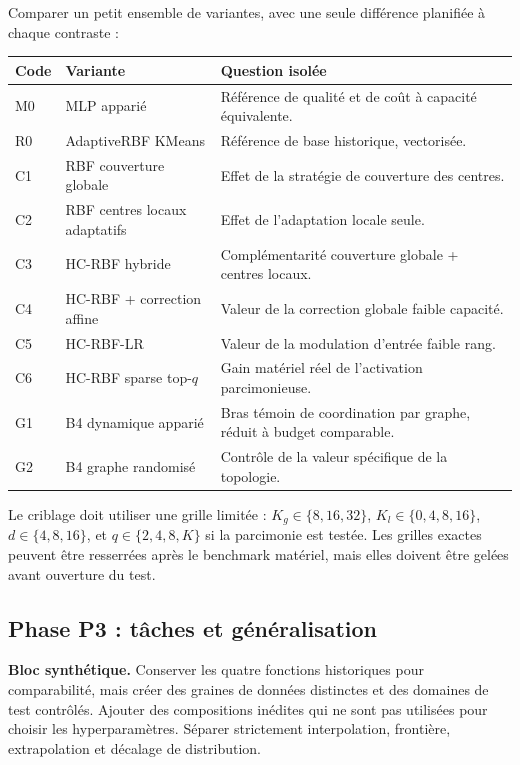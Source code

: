 \documentclass[11pt,a4paper]{article}
\begin{document}
Comparer un petit ensemble de variantes, avec une seule différence planifiée à chaque contraste :
\begin{center}
\small
\begin{tabular}{P{2.0cm}P{4.0cm}P{7.2cm}}
\toprule
\textbf{Code} & \textbf{Variante} & \textbf{Question isolée}\\
\midrule
M0 & MLP apparié & Référence de qualité et de coût à capacité équivalente.\\
R0 & AdaptiveRBF KMeans & Référence de base historique, vectorisée.\\
C1 & RBF couverture globale & Effet de la stratégie de couverture des centres.\\
C2 & RBF centres locaux adaptatifs & Effet de l'adaptation locale seule.\\
C3 & HC-RBF hybride & Complémentarité couverture globale + centres locaux.\\
C4 & HC-RBF + correction affine & Valeur de la correction globale faible capacité.\\
C5 & HC-RBF-LR & Valeur de la modulation d'entrée faible rang.\\
C6 & HC-RBF sparse top-$q$ & Gain matériel réel de l'activation parcimonieuse.\\
G1 & B4 dynamique apparié & Bras témoin de coordination par graphe, réduit à budget comparable.\\
G2 & B4 graphe randomisé & Contrôle de la valeur spécifique de la topologie.\\
\bottomrule
\end{tabular}
\end{center}

Le criblage doit utiliser une grille limitée : $K_g\in\{8,16,32\}$, $K_l\in\{0,4,8,16\}$, $d\in\{4,8,16\}$, et $q\in\{2,4,8,K\}$ si la parcimonie est testée. Les grilles exactes peuvent être resserrées après le benchmark matériel, mais elles doivent être gelées avant ouverture du test.

\subsection{Phase P3 : tâches et généralisation}

\textbf{Bloc synthétique.} Conserver les quatre fonctions historiques pour comparabilité, mais créer des graines de données distinctes et des domaines de test contrôlés. Ajouter des compositions inédites qui ne sont pas utilisées pour choisir les hyperparamètres. Séparer strictement interpolation, frontière, extrapolation et décalage de distribution.
\end{document}
